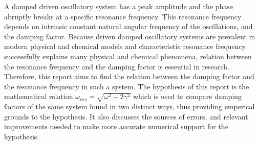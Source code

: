 A damped driven oscillatory system has a peak amplitude and the phase abruptly breaks at a specific resonance frequency. This resonance frequency depends on intrinsic constant natural angular frequency of the oscillations, and the damping factor. Because driven damped oscillatory systems are prevalent in modern physical and chemical models and characteristic resonance frequency successfully explains many physical and chemical phenomena, relation between the resonance frequency and the damping factor is essential in research. Therefore, this report aims to find the relation between the damping factor and the resonance frequency in such a system. The hypothesis of this report is the mathematical relation $\omega_{res} = \sqrt{\omega^2 - 2\gamma^2}$ which is used to compare damping factors of the same system found in two distinct ways, thus providing emperical grounds to the hypothesis. It also discusses the sources of errors, and relevant improvements needed to make more accurate numerical support for the hypothesis.
